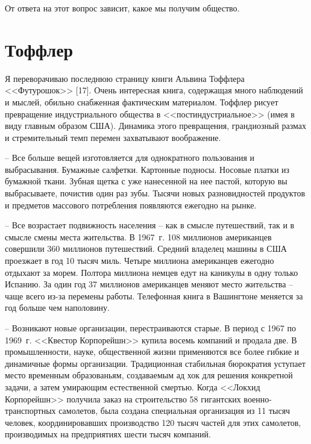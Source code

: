 \documentclass{book}
\begin{document}
От ответа на этот вопрос зависит, какое мы получим общество.


\section{Тоффлер}

Я переворачиваю последнюю страницу книги Альвина Тоффлера <<Футурошок>> [17]. Очень интересная книга, содержащая много наблюдений и мыслей, обильно снабженная фактическим материалом. Тоффлер рисует превращение индустриального общества в <<постиндустриальное>> (имея в виду главным образом США). Динамика этого превращения, грандиозный размах и стремительный темп перемен захватывают воображение.

-- Все больше вещей изготовляется для однократного пользования и выбрасывания. Бумажные салфетки. Картонные подносы. Носовые платки из бумажной ткани. Зубная щетка с уже нанесенной на нее пастой, которую вы выбрасываете, почистив один раз зубы. Тысячи новых разновидностей продуктов и предметов массового потребления появляются ежегодно на рынке.

-- Все возрастает подвижность населения -- как в смысле путешествий, так и в смысле смены места жительства. В 1967~г. 108 миллионов американцев совершили 360 миллионов путешествий. Средний владелец машины в США проезжает в год 10 тысяч миль. Четыре миллиона американцев ежегодно отдыхают за морем. Полтора миллиона немцев едут на каникулы в одну только Испанию. За один год 37 миллионов американцев меняют место жительства -- чаще всего из-за перемены работы. Телефонная книга в Вашингтоне меняется за год больше чем наполовину.

-- Возникают новые организации, перестраиваются старые. В период с 1967 по 1969~г. <<Квестор Корпорейшн>> купила восемь компаний и продала две. В промышленности, науке, общественной жизни применяются все более гибкие и динамичные формы организации. Традиционная стабильная бюрократия уступает место временным образованьям, создаваемым ад хок для решения конкретной задачи, а затем умирающим естественной смертью. Когда <<Локхид Корпорейшн>> получила заказ на строительство 58 гигантских военно-транспортных самолетов, была создана специальная организация из 11 тысяч человек, координировавших производство 120 тысяч частей для этих самолетов, производимых на предприятиях шести тысяч компаний.
\end{document}
